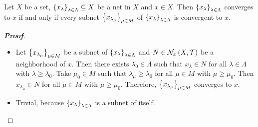 \begin{proposition}
  Let $X$ be a set, $\left\{x_\lambda\right\}_{\lambda\in\Lambda}\subseteq X$ be a net in $X$ and $x\in X$. Then $\left\{x_\lambda\right\}_{\lambda\in\Lambda}$ converges to $x$ if and only if every subnet $\left\{x_{\lambda_\mu}\right\}_{\mu\in M}$ of $\left\{x_\lambda\right\}_{\lambda\in\Lambda}$ is convergent to $x$.
  \begin{proof}[\rm\textbf{Proof}]
    \hfill
    \begin{itemize}
      \item[$\boxed{\Rightarrow}$] Let $\left\{x_{\lambda_\mu}\right\}_{\mu\in M}$ be a subnet of $\left\{x_\lambda\right\}_{\lambda\in\Lambda}$ and $N\in\mathcal{N}_x\left(X,\mathcal{T}\right)$ be a neighborhood of $x$. Then there exists $\lambda_0\in\Lambda$ such that $x_\lambda\in N$ for all $\lambda\in\Lambda$ with $\lambda\geq \lambda_0$. Take $\mu_0\in M$ such that $\lambda_\mu\geq\lambda_0$ for all $\mu\in M$ with $\mu\geq\mu_0$. Then  $x_{\lambda_\mu}\in N$ for all $\mu\in M$ with $\mu\geq\mu_0$. Therefore, $\left\{x_{\lambda_\mu}\right\}_{\mu\in M}$ converges to $x$.
      \item[$\boxed{\Leftarrow}$] Trivial, because $\left\{x_\lambda\right\}_{\lambda\in\Lambda}$ is a subnet of itself.
    \end{itemize}
  \end{proof} 
\end{proposition}

